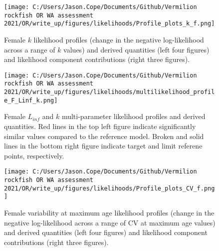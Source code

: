 \documentclass[11pt,
  english,
  a4paper,
]{article}
\begin{document}
\begin{figure}
\centering
\texttt{[image: C:/Users/Jason.Cope/Documents/Github/Vermilion rockfish OR WA assessment 2021/OR/write\_up/figures/likelihoods/Profile\_plots\_k\_f.png]}
\caption{Female {\(k\)\leavevmode\tagmcend\tagstructend} likelihood profiles (change in the negative log-likelihood across a range of {\(k\)\leavevmode\tagmcend\tagstructend} values) and derived quantities (left four figures) and likelihood component contributions (right three figures).\label{fig:k_f-profile-combo}}
\end{figure}

\tagmcend\tagstructend


\begin{figure}
\centering
\texttt{[image: C:/Users/Jason.Cope/Documents/Github/Vermilion rockfish OR WA assessment 2021/OR/write\_up/figures/likelihoods/multilikelihood\_profile\_F\_Linf\_k.png]}
\caption{Female {\(L_{inf}\)\leavevmode\tagmcend\tagstructend} and {\(k\)\leavevmode\tagmcend\tagstructend} multi-parameter likelihood profiles and derived quantities. Red lines in the top left figure indicate significantly similar values compared to the reference model. Broken and solid lines in the bottom right figure indicate target and limit referene points, respectively.\label{fig:Linf_k_f-profile}}
\end{figure}

\tagmcend\tagstructend


\begin{figure}
\centering
\texttt{[image: C:/Users/Jason.Cope/Documents/Github/Vermilion rockfish OR WA assessment 2021/OR/write\_up/figures/likelihoods/Profile\_plots\_CV\_f.png]}
\caption{Female variability at maximum age likelihood profiles (change in the negative log-likelihood across a range of CV at maximum age values) and derived quantities (left four figures) and likelihood component contributions (right three figures).\label{fig:CVold_f-profile-combo}}
\end{figure}
\end{document}

